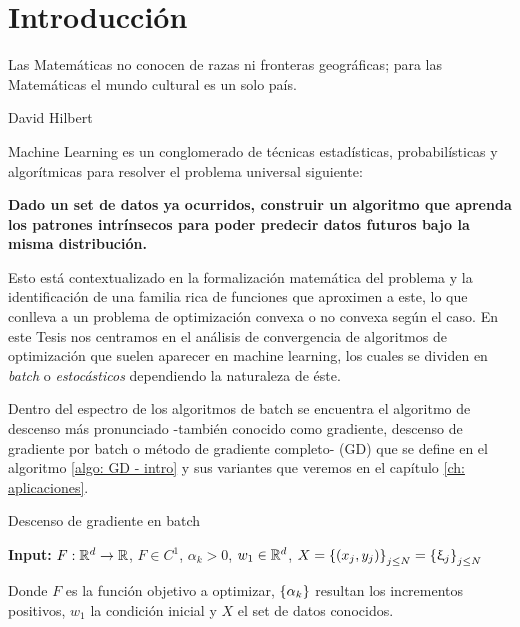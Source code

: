 \chapter{Introducci\'on}\label{ch:introduccion}

\epigraph{Las Matem\'aticas no conocen de razas ni fronteras geogr\'aficas; para las Matem\'aticas el mundo cultural es un solo pa\'is.}{David Hilbert}

Machine Learning es un conglomerado de t\'ecnicas estad\'isticas, probabil\'isticas y algor\'itmicas para resolver el problema universal siguiente:

\begin{center}
\textbf{Dado un set de datos ya ocurridos, construir un algoritmo que aprenda los patrones intr\'insecos para poder predecir datos futuros bajo la misma distribuci\'on.}
\end{center}

Esto est\'a contextualizado en la formalizaci\'on matem\'atica del problema y la identificaci\'on de una familia rica de funciones que aproximen a este, lo que conlleva a un problema de optimizaci\'on convexa o no convexa seg\'un el caso. En este Tesis nos centramos en el an\'alisis de convergencia de algoritmos de optimizaci\'on que suelen aparecer en machine learning, los cuales se dividen en \textit{batch} o \textit{estoc\'asticos} dependiendo la naturaleza de \'este.

Dentro del espectro de los algoritmos de batch se encuentra el algoritmo de descenso m\'as pronunciado -tambi\'en conocido como gradiente, descenso de gradiente por batch o m\'etodo de gradiente completo- (GD) que se define en el algoritmo \ref{algo: GD - intro} y sus variantes que veremos en el cap\'itulo \ref{ch: aplicaciones}.

\LinesNumbered
\begin{algorithm}[H]
	\caption{Descenso de gradiente en batch \label{algo: GD - intro}}
	\textbf{Input:} $F: {\mathbb{R}}^d \rightarrow {\mathbb{R}}$, $F \in C^1$, $\alpha_k >0$, $w_1 \in {\mathbb{R}}^d$, $X = \left\lbrace(x_j,y_j)\right\rbrace_{j \leq N} = \left\lbrace\upxi_j\right\rbrace_{j \leq N}$  \\
\end{algorithm}

Donde $F$ es la funci\'on objetivo a optimizar, $\left\lbrace\alpha_k\right\rbrace$ resultan los incrementos positivos, $w_1$ la condici\'on inicial y $X$ el set de datos conocidos. 

